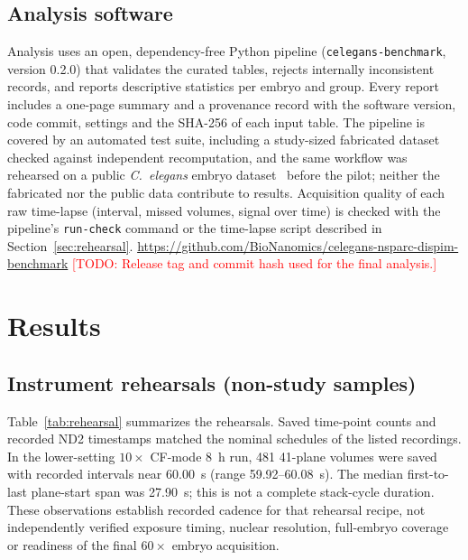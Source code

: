 \documentclass[11pt]{article}
\newcommand{\todo}[1]{\textcolor{red}{[TODO: #1]}}
\begin{document}
\subsection{Analysis software}
Analysis uses an open, dependency-free Python pipeline (\texttt{celegans-benchmark},
version 0.2.0) that validates the curated tables, rejects internally inconsistent
records, and reports descriptive statistics per embryo and group. Every report
includes a one-page summary and a provenance record with the software version, code
commit, settings and the SHA-256 of each input table. The pipeline is covered by
an automated test suite, including a study-sized fabricated dataset checked
against independent recomputation, and the same workflow was rehearsed on a public
\textit{C.\ elegans} embryo dataset~\cite{sugawara2021data} before the pilot; neither
the fabricated nor the public data contribute to results. Acquisition quality of each
raw time-lapse (interval, missed volumes, signal over time) is checked with the
pipeline's \texttt{run-check} command or the time-lapse script described in
Section~\ref{sec:rehearsal}.
\url{https://github.com/BioNanomics/celegans-nsparc-dispim-benchmark}
\todo{Release tag and commit hash used for the final analysis.}

\section{Results}
\subsection{Instrument rehearsals (non-study samples)}\label{sec:rehearsal-results}
Table~\ref{tab:rehearsal} summarizes the rehearsals. Saved time-point counts and
recorded ND2 timestamps matched the nominal schedules of the listed recordings.
In the lower-setting $10\times$ CF-mode 8~h run, 481 41-plane volumes were saved
with recorded intervals near 60.00~s (range 59.92--60.08~s). The median
first-to-last plane-start span was 27.90~s; this is not a complete stack-cycle
duration. These observations establish recorded cadence for that rehearsal recipe,
not independently verified exposure timing, nuclear resolution, full-embryo coverage
or readiness of the final $60\times$ embryo acquisition.
\end{document}

